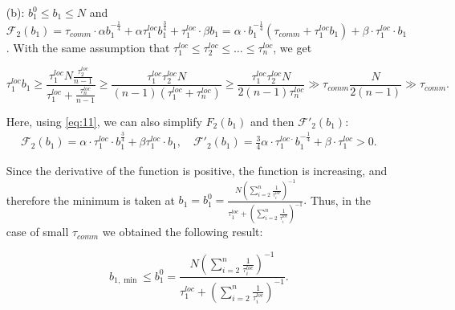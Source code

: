 \documentclass{article}
\theoremstyle{definition}
\theoremstyle{plain}
\begin{document}
\begin{itemize}
    \item[(b):] $b_1^0\leq b_1\leq N$ and $\mathcal{F}_2(b_1) = \tau_{comm}\cdot 
    \alpha  b_1^{-\frac{1}{4}} + 
    \alpha\tau_1^{loc} b_1^{\frac{3}{4}}  + \tau_1^{loc}\cdot \beta b_1 =  \alpha\cdot b_1^{-\frac{1}{4}}(\tau_{comm} + \tau_1^{loc}b_1) + \beta\cdot\tau_1^{loc}\cdot b_1$. With the same assumption that $
    \tau_1^{loc} \leq \tau_2^{loc} \leq\ldots \leq \tau_n^{loc}
    $, we get
    
    \begin{equation}
    \label{eq:11}
      \tau_1^{loc}b_1 {\geq} \frac{\tau_1^{loc}N\frac{\tau_2^{loc}}{n - 1}}{\tau_1^{loc} + \frac{\tau_n^{loc}}{n - 1}}\geq \frac{\tau_1^{loc}\tau_2^{loc}N}{(n - 1)(\tau_1^{loc} + \tau_n^{loc})}\geq \frac{\tau_1^{loc}\tau_2^{loc}N}{2(n - 1)\tau_n^{loc}} \gg
       \tau_{comm}\frac{N}{2(n - 1)} \gg \tau_{comm}.
    \end{equation}
    
    Here, using \eqref{eq:11}, we can also simplify $F_2(b_1)$ and then $\mathcal{F'}_2(b_1)$:
    \begin{eqnarray*}
        \mathcal F_2(b_1) = \alpha\cdot\tau_1^{loc}\cdot b_1^{\frac{3}{4}} + \beta \tau_1^{loc}\cdot b_1, \quad 
        \mathcal{F'}_2(b_1) = \frac{3}{4}\alpha\cdot\tau_1^{loc\cdot} b_1^{-\frac{1}{4}} + \beta\cdot\tau_1^{loc} > 0.
    \end{eqnarray*}
    
    Since the derivative of the function is positive, the function is increasing, and therefore the minimum is taken at $b_1 = b_1^{0} = \frac{N (\sum\limits_{i = 2}^{n} \frac{1}{\tau_i^{loc}})^{-1}}{\tau_1^{loc} + (\sum\limits_{i = 2}^{n} \frac{1}{\tau_i^{loc}})^{-1}}.$  
Thus, in the case of small $\tau_{comm}$ we obtained the following result: 

\begin{equation}
    \label{eq:temp505}
    b_{1,{\min}} \leq b_1^0 = \frac{N (\sum\limits_{i = 2}^{n} \frac{1}{\tau_i^{loc}})^{-1}}{\tau_1^{loc} + (\sum\limits_{i = 2}^{n} \frac{1}{\tau_i^{loc}})^{-1}}.
\end{equation}
\end{itemize}
\end{document}
